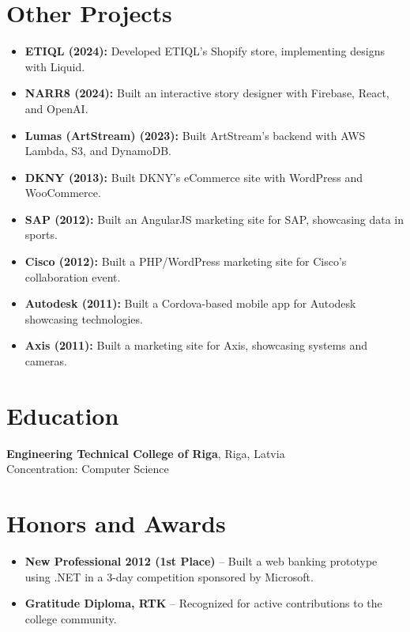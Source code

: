 \documentclass[a4paper,10pt]{article}
\begin{document}
\section{Other Projects}
\begin{itemize}[noitemsep,topsep=0pt]
    \item \textbf{ETIQL (2024):} Developed ETIQL’s Shopify store, implementing designs with Liquid.
    \item \textbf{NARR8 (2024):} Built an interactive story designer with Firebase, React, and OpenAI.
    \item \textbf{Lumas (ArtStream) (2023):} Built ArtStream’s backend with AWS Lambda, S3, and DynamoDB.
    \item \textbf{DKNY (2013):} Built DKNY’s eCommerce site with WordPress and WooCommerce.
    \item \textbf{SAP (2012):} Built an AngularJS marketing site for SAP, showcasing data in sports.
    \item \textbf{Cisco (2012):} Built a PHP/WordPress marketing site for Cisco’s collaboration event.
    \item \textbf{Autodesk (2011):} Built a Cordova-based mobile app for Autodesk showcasing technologies.
    \item \textbf{Axis (2011):} Built a marketing site for Axis, showcasing systems and cameras.
\end{itemize}

\section{Education}
\textbf{Engineering Technical College of Riga}, Riga, Latvia \\
Concentration: Computer Science

\section{Honors and Awards}
\begin{itemize}[noitemsep,topsep=0pt]
    \item \textbf{New Professional 2012 (1st Place)} – Built a web banking prototype using .NET in a 3-day competition sponsored by Microsoft.
    \item \textbf{Gratitude Diploma, RTK} – Recognized for active contributions to the college community.
\end{itemize}
\end{document}
